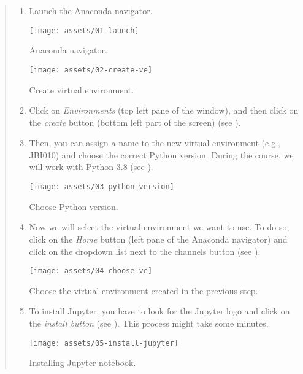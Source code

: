 \documentclass{latex-template/tufte-handout}
\begin{document}
\begin{quote}
	\begin{enumerate}
		\item Launch the Anaconda navigator.
			\begin{marginfigure}[-50em]
			  \texttt{[image: assets/01-launch]}
			  \caption{Anaconda navigator.}
			  \label{fig:img1}
			\end{marginfigure}
			\begin{marginfigure}[-28em]%
			  \texttt{[image: assets/02-create-ve]}
			  \caption{Create virtual environment.}
			  \label{fig:img2}
			\end{marginfigure}
		\item Click on \emph{Environments} (top left pane of the window), and then click on the \emph{create} button (bottom left part of the screen) (see ).
		\item Then, you can assign a name to the new virtual environment (e.g., JBI010) and choose the correct Python version. During the course, we will work with Python 3.8 (see ).
			\begin{marginfigure}[-20em]%
			  \texttt{[image: assets/03-python-version]}
			  \caption{Choose Python version.}
			  \label{fig:img3}
			\end{marginfigure}
		\item Now we will select the virtual environment we want to use. To do so, click on the \emph{Home} button (left pane of the Anaconda navigator) and click on the dropdown list next to the channels button (see ).
			\begin{marginfigure}[-7em]%
			  \texttt{[image: assets/04-choose-ve]}
			  \caption{Choose the virtual environment created in the previous step.}
			  \label{fig:img4}
			\end{marginfigure}
		\item To install Jupyter, you have to  look for the Jupyter logo and click on the \emph{install button} (see ). This process might take some minutes.
			\begin{marginfigure}%
			  \texttt{[image: assets/05-install-jupyter]}
			  \caption{Installing Jupyter notebook.}
			  \label{fig:img5}
			\end{marginfigure}
	\end{enumerate}
\end{quote}
\end{document}
